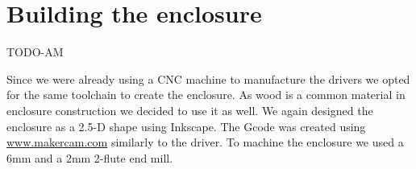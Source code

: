 \documentclass{article}
\begin{document}
%

\section{Building the enclosure}
\label{s:enclosure}
TODO-AM

Since we were already using a CNC machine to manufacture the drivers we opted for the same toolchain to create the enclosure. As wood is a common material in enclosure construction we decided to use it as well. We again designed the enclosure as a 2.5-D shape using Inkscape. The Gcode was created using \url{www.makercam.com} similarly to the driver. To machine the enclosure we used a 6mm and a 2mm 2-flute end mill.
\end{document}
